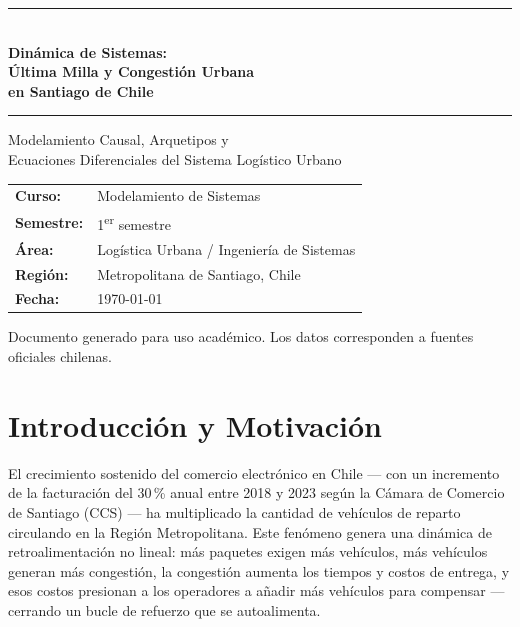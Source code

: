 \documentclass[12pt,a4paper]{article}
\begin{document}
\begin{titlepage}
\centering
\vspace*{1cm}
{\color{azulUCH}\rule{\linewidth}{1.5pt}}\\[0.8em]
{\LARGE\bfseries Dinámica de Sistemas:\\[0.3em]
Última Milla y Congestión Urbana\\[0.3em]
en Santiago de Chile}\\[0.6em]
{\color{azulUCH}\rule{\linewidth}{1.5pt}}

\vspace{2cm}
{\large Modelamiento Causal, Arquetipos y\\
Ecuaciones Diferenciales del Sistema Logístico Urbano}

\vspace{3cm}
\begin{tabular}{ll}
\textbf{Curso:}   & Modelamiento de Sistemas \\[4pt]
\textbf{Semestre:} & 1\textsuperscript{er} semestre \\[4pt]
\textbf{Área:}    & Logística Urbana / Ingeniería de Sistemas \\[4pt]
\textbf{Región:}  & Metropolitana de Santiago, Chile \\[4pt]
\textbf{Fecha:}   & \today \\
\end{tabular}

\vfill
{\small\textcolor{grisOscuro}{Documento generado para uso académico.
Los datos corresponden a fuentes oficiales chilenas.}}
\end{titlepage}

\tableofcontents
\newpage

\section{Introducción y Motivación}

El crecimiento sostenido del comercio electrónico en Chile — con un
incremento de la facturación del 30\,\% anual entre 2018 y 2023 según
la Cámara de Comercio de Santiago (CCS) — ha multiplicado la cantidad
de vehículos de reparto circulando en la Región Metropolitana.
Este fenómeno genera una dinámica de retroalimentación no lineal:
más paquetes exigen más vehículos, más vehículos generan más
congestión, la congestión aumenta los tiempos y costos de entrega,
y esos costos presionan a los operadores a añadir más vehículos
para compensar — cerrando un bucle de refuerzo que se autoalimenta.
\end{document}
